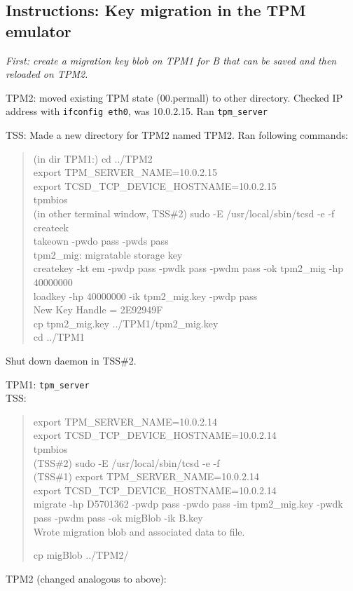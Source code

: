 \documentclass[10pt]{article}
\newcommand{\command}[1]{\texttt{#1}}
\begin{document}
\subsection{Instructions: Key migration in the TPM emulator}
\textit{First: create a migration key blob on TPM1 for B that can be saved and then reloaded on TPM2.}

TPM2: moved existing TPM state (00.permall) to other directory. Checked IP address with \command{ifconfig eth0}, was 10.0.2.15. Ran \command{tpm\_server}

TSS: Made a new directory for TPM2 named TPM2. Ran following commands: \\
\begin{quote}
(in dir TPM1:) cd ../TPM2 \\
export TPM\_SERVER\_NAME=10.0.2.15 \\
export TCSD\_TCP\_DEVICE\_HOSTNAME=10.0.2.15 \\
tpmbios \\
(in other terminal window, TSS\#2) sudo -E /usr/local/sbin/tcsd -e -f \\

createek \\
takeown -pwdo pass -pwds pass\\

tpm2\_mig: migratable storage key \\
createkey -kt em -pwdp pass -pwdk pass -pwdm pass -ok tpm2\_mig -hp 40000000\\
loadkey -hp 40000000 -ik tpm2\_mig.key -pwdp pass\\
New Key Handle =  2E92949F\\

cp tpm2\_mig.key ../TPM1/tpm2\_mig.key \\
cd ../TPM1
\end{quote}

Shut down daemon in TSS\#2.

TPM1:  \command{tpm\_server } \\

TSS: \\
\begin{quote}
export TPM\_SERVER\_NAME=10.0.2.14 \\
export TCSD\_TCP\_DEVICE\_HOSTNAME=10.0.2.14 \\
tpmbios \\
(TSS\#2) sudo -E /usr/local/sbin/tcsd -e -f \\

(TSS\#1) export TPM\_SERVER\_NAME=10.0.2.14 \\
export TCSD\_TCP\_DEVICE\_HOSTNAME=10.0.2.14 \\

migrate -hp D5701362 -pwdp pass -pwdo pass -im tpm2\_mig.key -pwdk pass -pwdm pass -ok migBlob -ik B.key\\
Wrote migration blob and associated data to file.

cp migBlob ../TPM2/

\end{quote}
TPM2 (changed analogous to above):
\end{document}
